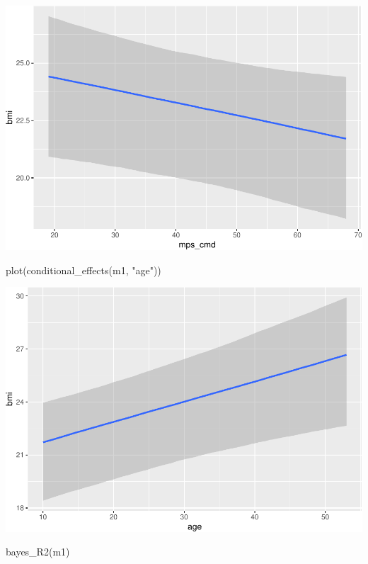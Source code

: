 \documentclass[
]{article}
\newenvironment{Shaded}{\begin{snugshade}}{\end{snugshade}}
\newcommand{\FunctionTok}[1]{\textcolor[rgb]{0.00,0.00,0.00}{#1}}
\newcommand{\NormalTok}[1]{#1}
\newcommand{\StringTok}[1]{\textcolor[rgb]{0.31,0.60,0.02}{#1}}
\begin{document}
\includegraphics{050_quest_groups_files/figure-latex/unnamed-chunk-1-6.pdf}

\begin{Shaded}
\begin{Highlighting}[]
\FunctionTok{plot}\NormalTok{(}\FunctionTok{conditional\_effects}\NormalTok{(m1, }\StringTok{"age"}\NormalTok{))}
\end{Highlighting}
\end{Shaded}

\includegraphics{050_quest_groups_files/figure-latex/unnamed-chunk-1-7.pdf}

\begin{Shaded}
\begin{Highlighting}[]
\FunctionTok{bayes\_R2}\NormalTok{(m1)}
\end{Highlighting}
\end{Shaded}
\end{document}
